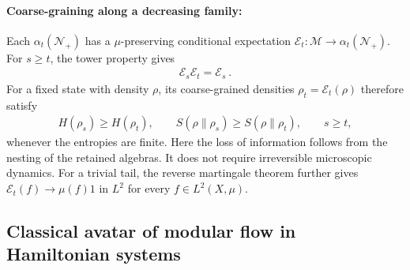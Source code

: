 \documentclass[a4paper,11pt]{article}
\theoremstyle{definition}
\newcommand{\mN}{\mathcal{N}}
\newcommand{\mM}{\mathcal{M}}
\newcommand{\mE}{\mathcal{E}}
\begin{document}
\paragraph{Coarse-graining along a decreasing family:}
Each $\alpha_t(\mN_+)$ has a $\mu$-preserving conditional expectation $\mE_t:\mM\to\alpha_t(\mN_+)$. For $s\geq t$, the tower property gives
\begin{align}
    \mE_s\mE_t=\mE_s\ .
\end{align}
For a fixed state with density $\rho$, its coarse-grained densities $\rho_t=\mE_t(\rho)$ therefore satisfy
\begin{align}
    H(\rho_s)\geq H(\rho_t),
    \qquad
    S(\rho\|\rho_s)\geq S(\rho\|\rho_t),
    \qquad s\geq t,
\end{align}
whenever the entropies are finite. Here the loss of information follows from the nesting of the retained algebras. It does not require irreversible microscopic dynamics. For a trivial tail, the reverse martingale theorem further gives $\mE_t(f)\to\mu(f)1$ in $L^2$ for every $f\in L^2(X,\mu)$.



\subsection{Classical avatar of modular flow in Hamiltonian systems}
\label{subsec:classical-state-flow}
\end{document}
